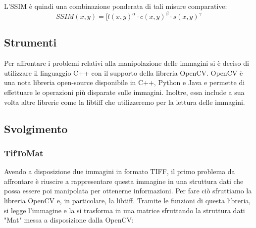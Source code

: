 \documentclass[a4paper,11pt]{article}
\begin{document}
    L'SSIM è quindi una combinazione ponderata di tali misure comparative:
    $$SSIM(x,y) = [l(x,y)^\alpha \cdot c(x,y)^\beta \cdot s(x,y)^\gamma$$

    \subsection{Strumenti}
    Per affrontare i problemi relativi alla manipolazione delle immagini si è deciso di utilizzare il linguaggio C++ con il supporto della libreria OpenCV.
    OpenCV è una nota libreria open-source disponibile in C++, Python e Java e permette di effettuare le operazioni più disparate sulle immagini.
    Inoltre, essa include a sua volta altre librerie come la libtiff che utilizzeremo per la lettura delle immagini.
    \subsection{Svolgimento}
    \subsubsection{TifToMat}
    Avendo a disposizione due immagini in formato TIFF, il primo problema da affrontare è riuscire a rappresentare questa immagine in una struttura dati che possa essere poi manipolata per ottenerne informazioni.
    Per fare ciò sfruttiamo la libreria OpenCV e, in particolare, la libtiff. Tramite le funzioni di questa libreria, si legge l'immagine e la si trasforma in una matrice sfruttando la struttura dati "Mat" messa a disposizione dalla OpenCV:
\end{document}

